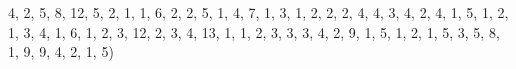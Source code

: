 \documentclass[]{book}
\newenvironment{Shaded}{\begin{snugshade}}{\end{snugshade}}
\newcommand{\DecValTok}[1]{\textcolor[rgb]{0.00,0.00,0.81}{#1}}
\newcommand{\NormalTok}[1]{#1}
\begin{document}
\begin{Shaded}
\begin{Highlighting}[]
              \DecValTok{4}\NormalTok{, }\DecValTok{2}\NormalTok{, }\DecValTok{5}\NormalTok{, }\DecValTok{8}\NormalTok{, }\DecValTok{12}\NormalTok{, }\DecValTok{5}\NormalTok{, }\DecValTok{2}\NormalTok{, }\DecValTok{1}\NormalTok{, }\DecValTok{1}\NormalTok{, }\DecValTok{6}\NormalTok{, }\DecValTok{2}\NormalTok{, }\DecValTok{2}\NormalTok{, }\DecValTok{5}\NormalTok{, }\DecValTok{1}\NormalTok{, }\DecValTok{4}\NormalTok{, }\DecValTok{7}\NormalTok{, }\DecValTok{1}\NormalTok{, }\DecValTok{3}\NormalTok{, }\DecValTok{1}\NormalTok{, }\DecValTok{2}\NormalTok{, }
              \DecValTok{2}\NormalTok{, }\DecValTok{2}\NormalTok{, }\DecValTok{4}\NormalTok{, }\DecValTok{4}\NormalTok{, }\DecValTok{3}\NormalTok{, }\DecValTok{4}\NormalTok{, }\DecValTok{2}\NormalTok{, }\DecValTok{4}\NormalTok{, }\DecValTok{1}\NormalTok{, }\DecValTok{5}\NormalTok{, }\DecValTok{1}\NormalTok{, }\DecValTok{2}\NormalTok{, }\DecValTok{1}\NormalTok{, }\DecValTok{3}\NormalTok{, }\DecValTok{4}\NormalTok{, }\DecValTok{1}\NormalTok{, }\DecValTok{6}\NormalTok{, }\DecValTok{1}\NormalTok{, }\DecValTok{2}\NormalTok{, }\DecValTok{3}\NormalTok{,}
              \DecValTok{12}\NormalTok{, }\DecValTok{2}\NormalTok{, }\DecValTok{3}\NormalTok{, }\DecValTok{4}\NormalTok{, }\DecValTok{13}\NormalTok{, }\DecValTok{1}\NormalTok{, }\DecValTok{1}\NormalTok{, }\DecValTok{2}\NormalTok{, }\DecValTok{3}\NormalTok{, }\DecValTok{3}\NormalTok{, }\DecValTok{3}\NormalTok{, }\DecValTok{4}\NormalTok{, }\DecValTok{2}\NormalTok{, }\DecValTok{9}\NormalTok{, }\DecValTok{1}\NormalTok{, }\DecValTok{5}\NormalTok{, }\DecValTok{1}\NormalTok{, }\DecValTok{2}\NormalTok{, }\DecValTok{1}\NormalTok{, }\DecValTok{5}\NormalTok{, }
              \DecValTok{3}\NormalTok{, }\DecValTok{5}\NormalTok{, }\DecValTok{8}\NormalTok{, }\DecValTok{1}\NormalTok{, }\DecValTok{9}\NormalTok{, }\DecValTok{9}\NormalTok{, }\DecValTok{4}\NormalTok{, }\DecValTok{2}\NormalTok{, }\DecValTok{1}\NormalTok{, }\DecValTok{5}\NormalTok{)}


\end{Highlighting}
\end{Shaded}
\end{document}
